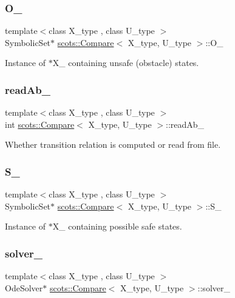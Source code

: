 \subsubsection{\texorpdfstring{O\+\_\+}{O\_}}
{\footnotesize\ttfamily template$<$class X\+\_\+type , class U\+\_\+type $>$ \\
Symbolic\+Set$\ast$ \hyperlink{classscots_1_1Compare}{scots\+::\+Compare}$<$ X\+\_\+type, U\+\_\+type $>$\+::O\+\_\+}

Instance of $\ast$\+X\+\_\+ containing unsafe (obstacle) states. \mbox{\label{classscots_1_1Compare_ad18456a4cc253ae0d300cda74517e64b}} 
\subsubsection{\texorpdfstring{read\+Ab\+\_\+}{readAb\_}}
{\footnotesize\ttfamily template$<$class X\+\_\+type , class U\+\_\+type $>$ \\
int \hyperlink{classscots_1_1Compare}{scots\+::\+Compare}$<$ X\+\_\+type, U\+\_\+type $>$\+::read\+Ab\+\_\+}

Whether transition relation is computed or read from file. \mbox{\label{classscots_1_1Compare_a2512f264f83a21365693bbd506b9e7a2}} 
\subsubsection{\texorpdfstring{S\+\_\+}{S\_}}
{\footnotesize\ttfamily template$<$class X\+\_\+type , class U\+\_\+type $>$ \\
Symbolic\+Set$\ast$ \hyperlink{classscots_1_1Compare}{scots\+::\+Compare}$<$ X\+\_\+type, U\+\_\+type $>$\+::S\+\_\+}

Instance of $\ast$\+X\+\_\+ containing possible safe states. \mbox{\label{classscots_1_1Compare_aa42864e8794631891d01f0367e1db277}} 
\subsubsection{\texorpdfstring{solver\+\_\+}{solver\_}}
{\footnotesize\ttfamily template$<$class X\+\_\+type , class U\+\_\+type $>$ \\
Ode\+Solver$\ast$ \hyperlink{classscots_1_1Compare}{scots\+::\+Compare}$<$ X\+\_\+type, U\+\_\+type $>$\+::solver\+\_\+}

